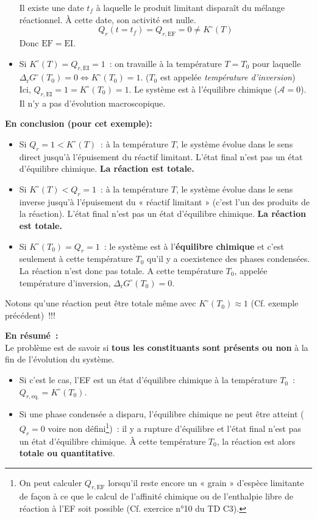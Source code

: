 \documentclass{article}
\newcommand{\Dr}{\Delta_{\mathrm{r}}}
\newcommand{\EI}{\mathrm{EI}}
\newcommand{\EF}{\mathrm{EF}}
\newcommand{\equi}{\text{eq.}}
\begin{document}
\begin{tableau}
\begin{itemize}
        Il existe une date $t_f$ à laquelle le produit limitant disparaît du mélange réactionnel. À cette date, son activité est nulle.
        $$Q_{r}(t=t_f) = Q_{r,\EF} = 0 \neq K^\circ(T)$$
        Donc $\EF = \EI$.
        \item Si $K^\circ(T) = Q_{r,\EI}=1$~: on travaille à la température $T=T_0$ pour laquelle $\Dr G^\circ(T_0) = 0 \iff K^\circ(T_0)=1$. ($T_0$ est appelée \textit{température d'inversion})\\
        Ici, $Q_{r,\EI} = 1 = K^\circ(T_0)=1$. Le système est à l'équilibre chimique ($\mathscr{A}=0$). Il n'y a pas d'évolution macroscopique.
    \end{itemize}
\end{tableau}
\textbf{En conclusion (pour cet exemple):}
\begin{itemize}
    \item Si $Q_r = 1 < K^\circ(T)$~: à la température $T$, le système évolue dans le sens direct jusqu’à  l’épuisement du réactif limitant. L’état final n’est pas un état d’équilibre chimique. \textbf{La réaction est totale.}
    \item Si $K^\circ(T) < Q_r = 1$~: à la température $T$, le système évolue dans le sens inverse jusqu’à  l’épuisement du « réactif limitant » (c’est l’un des produits de la réaction). L’état final n’est pas un état d’équilibre chimique. \textbf{La réaction est totale.}
    \item Si $K^\circ(T_0) = Q_r = 1$~: le système est à l’\textbf{équilibre chimique} et c’est seulement à cette température $T_0$ qu’il y a coexistence des phases condensées. La réaction n’est donc pas totale. A cette température $T_0$, appelée température d’inversion, $\Dr G^\circ(T_0) = 0$.
\end{itemize}

\begin{remarque}[Remarque]
    Notons qu’une réaction peut être totale même avec $K^\circ(T_0)\approx 1$  (Cf. exemple précédent)~!!!
\end{remarque}

\textbf{En résumé~:}\\
Le problème est de savoir si \textbf{tous les constituants sont présents ou non} à la fin de l’évolution du système.
\begin{itemize}
    \item Si c’est le cas, l’EF est un état d’équilibre chimique à la température $T_0$~: $Q_{r,\equi} = K^\circ(T_0)$.
    \item Si une phase condensée a disparu, l’équilibre chimique ne peut être atteint ($Q_r = 0$ voire non défini\footnote{On peut calculer $Q_{r,\EF}$ lorsqu’il reste encore un « grain » d’espèce limitante de façon à ce que le calcul de l’affinité chimique ou de l’enthalpie libre de réaction à l’EF soit possible (Cf. exercice n°10 du TD C3).})~: il y a rupture d’équilibre et l’état final n’est pas un état d’équilibre chimique. À cette température $T_0$, la réaction est alors \textbf{totale ou quantitative}.
\end{itemize}
\end{document}
